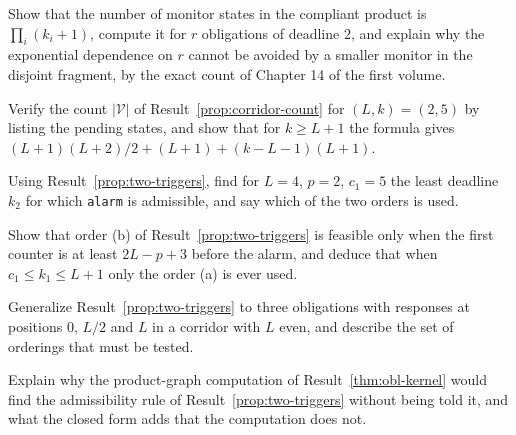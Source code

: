 \begin{exercise}
Show that the number of monitor states in the compliant product is $\prod_i(k_i+1)$, compute it for $r$ obligations of deadline $2$, and explain why the exponential dependence on $r$ cannot be avoided by a smaller monitor in the disjoint fragment, by the exact count of Chapter 14 of the first volume.\label{ex2:compliant-count}
\end{exercise}

\begin{exercise}
Verify the count $|\mathcal V|$ of Result~\ref{prop:corridor-count} for $(L,k)=(2,5)$ by listing the pending states, and show that for $k\ge L+1$ the formula gives $(L+1)(L+2)/2+(L+1)+(k-L-1)(L+1)$.
\end{exercise}

\begin{exercise}
Using Result~\ref{prop:two-triggers}, find for $L=4$, $p=2$, $c_1=5$ the least deadline $k_2$ for which \texttt{alarm} is admissible, and say which of the two orders is used.
\end{exercise}

\begin{exercise}
Show that order (b) of Result~\ref{prop:two-triggers} is feasible only when the first counter is at least $2L-p+3$ before the alarm, and deduce that when $c_1\le k_1\le L+1$ only the order (a) is ever used.\label{ex2:order-b}
\end{exercise}

\begin{exercise}
Generalize Result~\ref{prop:two-triggers} to three obligations with responses at positions $0$, $L/2$ and $L$ in a corridor with $L$ even, and describe the set of orderings that must be tested.
\end{exercise}

\begin{exercise}
Explain why the product-graph computation of Result~\ref{thm:obl-kernel} would find the admissibility rule of Result~\ref{prop:two-triggers} without being told it, and what the closed form adds that the computation does not.
\end{exercise}

